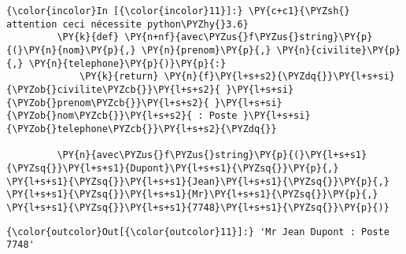     \begin{Verbatim}[commandchars=\\\{\},frame=single,framerule=0.3mm,rulecolor=\color{cellframecolor}]
{\color{incolor}In [{\color{incolor}11}]:} \PY{c+c1}{\PYZsh{} attention ceci nécessite python\PYZhy{}3.6}
         \PY{k}{def} \PY{n+nf}{avec\PYZus{}f\PYZus{}string}\PY{p}{(}\PY{n}{nom}\PY{p}{,} \PY{n}{prenom}\PY{p}{,} \PY{n}{civilite}\PY{p}{,} \PY{n}{telephone}\PY{p}{)}\PY{p}{:}
             \PY{k}{return} \PY{n}{f}\PY{l+s+s2}{\PYZdq{}}\PY{l+s+si}{\PYZob{}civilite\PYZcb{}}\PY{l+s+s2}{ }\PY{l+s+si}{\PYZob{}prenom\PYZcb{}}\PY{l+s+s2}{ }\PY{l+s+si}{\PYZob{}nom\PYZcb{}}\PY{l+s+s2}{ : Poste }\PY{l+s+si}{\PYZob{}telephone\PYZcb{}}\PY{l+s+s2}{\PYZdq{}}
         
         \PY{n}{avec\PYZus{}f\PYZus{}string}\PY{p}{(}\PY{l+s+s1}{\PYZsq{}}\PY{l+s+s1}{Dupont}\PY{l+s+s1}{\PYZsq{}}\PY{p}{,} \PY{l+s+s1}{\PYZsq{}}\PY{l+s+s1}{Jean}\PY{l+s+s1}{\PYZsq{}}\PY{p}{,} \PY{l+s+s1}{\PYZsq{}}\PY{l+s+s1}{Mr}\PY{l+s+s1}{\PYZsq{}}\PY{p}{,} \PY{l+s+s1}{\PYZsq{}}\PY{l+s+s1}{7748}\PY{l+s+s1}{\PYZsq{}}\PY{p}{)}
\end{Verbatim}


\begin{Verbatim}[commandchars=\\\{\},frame=single,framerule=0.3mm,rulecolor=\color{cellframecolor}]
{\color{outcolor}Out[{\color{outcolor}11}]:} 'Mr Jean Dupont : Poste 7748'
\end{Verbatim}
            

    
    
    
